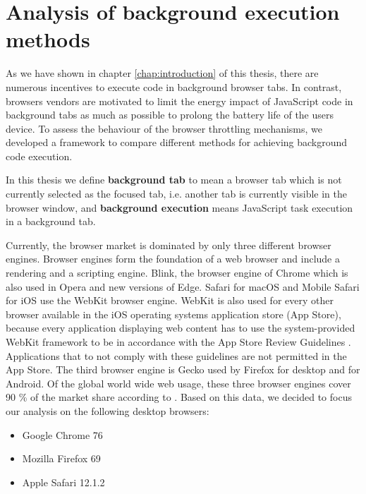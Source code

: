 \documentclass[
	ruledheaders=section,%
	class=report,%
	thesis={type=bachelor},%
	accentcolor=9c,%
	custommargins=true,%
	marginpar=false,%
	parskip=half-,%
	fontsize=11pt,%
]{tudapub}
\begin{document}
  
  \newpage
  \chapter{Analysis of background execution methods}
  \label{chap:analysis}

  As we have shown in chapter \ref{chap:introduction} of this thesis, there are numerous incentives to execute code in background browser tabs. In contrast, browsers vendors are motivated to limit the energy impact of JavaScript code in background tabs as much as possible to prolong the battery life of the users device. To assess the behaviour of the browser throttling mechanisms, we developed a framework to compare different methods for achieving background code execution.

   In this thesis we define \textbf{background tab} to mean a browser tab which is not currently selected as the focused tab, i.e. another tab is currently visible in the browser window, and \textbf{background execution} means JavaScript task execution in a background tab.

  Currently, the browser market is dominated by only three different browser engines. Browser engines form the foundation of a web browser and include a rendering and a scripting engine. Blink, the browser engine of Chrome which is also used in Opera and new versions of Edge. Safari for macOS and Mobile Safari for iOS use the WebKit browser engine. WebKit is also used for every other browser available in the iOS operating systems application store (App Store), because every application displaying web content has to use the system-provided WebKit framework to be in accordance with the App Store Review Guidelines \cite{apple-app-review-guideline}. Applications that to not comply with these guidelines are not permitted in the App Store. The third browser engine is Gecko used by Firefox for desktop and for Android. Of the global world wide web usage, these three browser engines cover 90 \% of the market share according to \cite{statcounter-global-browser-market-share}. Based on this data, we decided to focus our analysis on the following desktop browsers:

  \begin{itemize}
  \item Google Chrome 76
  \item Mozilla Firefox 69
  \item Apple Safari 12.1.2
  \end{itemize}
\end{document}
